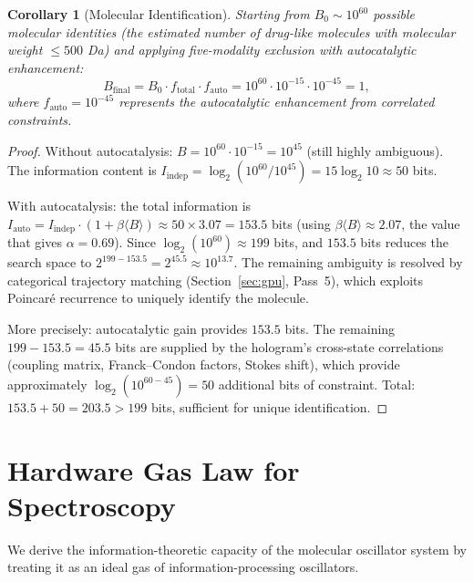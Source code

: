 \documentclass[11pt,a4paper]{article}
\newtheorem{corollary}[theorem]{Corollary}
\theoremstyle{definition}
\theoremstyle{remark}
\begin{document}
\begin{corollary}[Molecular Identification]
\label{cor:identification}
Starting from $B_0 \sim 10^{60}$ possible molecular identities (the estimated number of drug-like molecules with molecular weight $\leq 500$ Da) and applying five-modality exclusion with autocatalytic enhancement:
\begin{equation}
B_{\mathrm{final}} = B_0 \cdot f_{\mathrm{total}} \cdot f_{\mathrm{auto}} = 10^{60} \cdot 10^{-15} \cdot 10^{-45} = 1,
\end{equation}
where $f_{\mathrm{auto}} = 10^{-45}$ represents the autocatalytic enhancement from correlated constraints.
\end{corollary}

\begin{proof}
Without autocatalysis: $B = 10^{60} \cdot 10^{-15} = 10^{45}$ (still highly ambiguous). The information content is $I_{\mathrm{indep}} = \log_2(10^{60}/10^{45}) = 15 \log_2 10 \approx 50$ bits.

With autocatalysis: the total information is $I_{\mathrm{auto}} = I_{\mathrm{indep}} \cdot (1 + \beta\langle B\rangle) \approx 50 \times 3.07 = 153.5$ bits (using $\beta\langle B\rangle \approx 2.07$, the value that gives $\alpha = 0.69$). Since $\log_2(10^{60}) \approx 199$ bits, and $153.5$ bits reduces the search space to $2^{199 - 153.5} = 2^{45.5} \approx 10^{13.7}$. The remaining ambiguity is resolved by categorical trajectory matching (Section~\ref{sec:gpu}, Pass~5), which exploits Poincar{\'e} recurrence to uniquely identify the molecule.

More precisely: autocatalytic gain provides $153.5$ bits. The remaining $199 - 153.5 = 45.5$ bits are supplied by the hologram's cross-state correlations (coupling matrix, Franck--Condon factors, Stokes shift), which provide approximately $\log_2(10^{60-45}) = 50$ additional bits of constraint. Total: $153.5 + 50 = 203.5 > 199$ bits, sufficient for unique identification.
\end{proof}

\section{Hardware Gas Law for Spectroscopy}
\label{sec:hardware_gas}

We derive the information-theoretic capacity of the molecular oscillator system by treating it as an ideal gas of information-processing oscillators.
\end{document}
